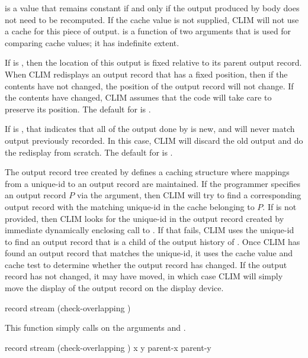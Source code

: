  is a value that remains constant if and only if the output
produced by body does not need to be recomputed.  If the cache value is not
supplied, CLIM will not use a cache for this piece of output.  
is a function of two arguments that is used for comparing cache values; it has
indefinite extent.

If  is , then the location of this output is
fixed relative to its parent output record.  When CLIM redisplays an output
record that has a fixed position, then if the contents have not changed, the
position of the output record will not change.  If the contents have changed,
CLIM assumes that the code will take care to preserve its position.  The default
for  is .

If  is , that indicates that all of the output done by
 is new, and will never match output previously recorded.  In this
case, CLIM will discard the old output and do the redisplay from scratch.  The
default for  is .

The output record tree created by  defines a caching
structure where mappings from a unique-id to an output record are maintained.
If the programmer specifies an output record $P$ via the
 argument, then CLIM will try to find a corresponding output
record with the matching unique-id in the cache belonging to $P$.  If 
 is not provided, then CLIM looks for the unique-id in the
output record created by immediate dynamically enclosing call to
.  If that fails, CLIM uses the unique-id to find an output
record that is a child of the output history of .  Once CLIM has
found an output record that matches the unique-id, it uses the cache value and
cache test to determine whether the output record has changed.  If the output
record has not changed, it may have moved, in which case CLIM will simply move
the display of the output record on the display device.


 {record stream \key (check-overlapping )}

This function simply calls  on the arguments
 and .

 {record stream
                                       \optional (check-overlapping ) 
                                                 x y parent-x parent-y}  

